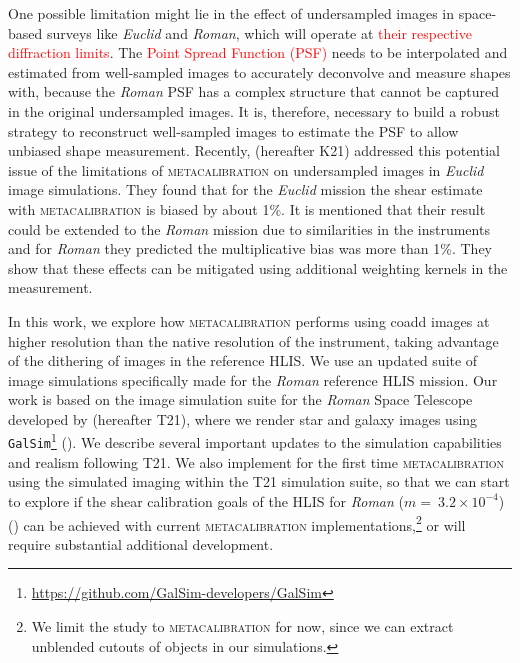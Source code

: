 \documentclass[fleqn,usenatbib]{mnras}
\begin{document}
One possible limitation might lie in the effect of undersampled images in space-based surveys like \emph{Euclid} and \emph{Roman}, which will operate at \textcolor{red}{their respective diffraction limits}. The \textcolor{red}{Point Spread Function (PSF)} needs to be interpolated and estimated from well-sampled images to accurately deconvolve and measure shapes with, because the \emph{Roman} PSF has a complex structure that cannot be captured in the original undersampled images. It is, therefore, necessary to build a robust strategy to reconstruct well-sampled images to estimate the PSF to allow unbiased shape measurement.
Recently, \cite{2021MNRAS.502.4048K} (hereafter K21) addressed this potential issue of the limitations of \textsc{metacalibration} on undersampled images in \emph{Euclid} image simulations. They found that for the \emph{Euclid} mission the shear estimate with \textsc{metacalibration} is biased by about 1$\%$. It is mentioned that their result could be extended to the \emph{Roman} mission due to similarities in the instruments and for \emph{Roman} they predicted the multiplicative bias was more than 1\%. They show that these effects can be mitigated using additional weighting kernels in the measurement. 

In this work, we explore how \textsc{metacalibration} performs using coadd images at higher resolution than the native resolution of the instrument, taking advantage of the dithering of images in the reference HLIS. We use an updated suite of image simulations specifically made for the \emph{Roman} reference HLIS mission. Our work is based on the image simulation suite for the \emph{Roman} Space Telescope developed by \cite{2021MNRAS.501.2044T} (hereafter T21), where we render star and galaxy images using \texttt{GalSim}\footnote{\url{ https://github.com/GalSim-developers/GalSim}} (\citealt{2015A&C....10..121R}). We describe several important updates to the simulation capabilities and realism following T21. We also implement for the first time \textsc{metacalibration} using the simulated imaging within the T21 simulation suite, so that we can start to explore if the shear calibration goals of the HLIS for \emph{Roman} ($m=~3.2\times10^{-4}$) (\citealt{2018arXiv180403628D}) can be achieved with current \textsc{metacalibration} implementations,\footnote{We limit the study to \textsc{metacalibration} for now, since we can extract unblended cutouts of objects in our simulations.} or will require substantial additional development. \par
\end{document}
